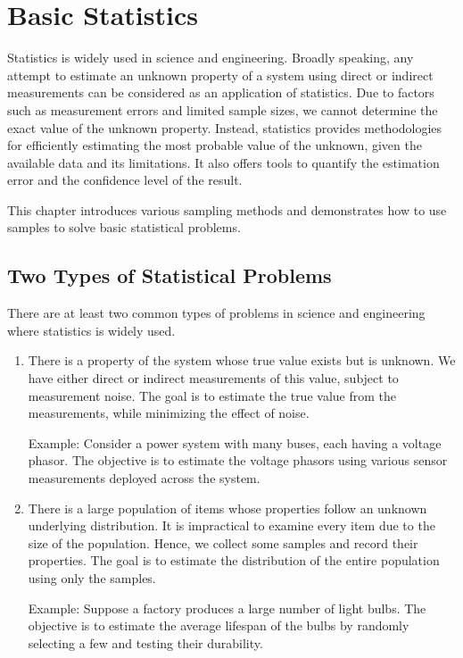 \chapter{Basic Statistics} \label{ch:statisticsandsampling}

Statistics is widely used in science and engineering. Broadly speaking, any attempt to estimate an unknown property of a system using direct or indirect measurements can be considered as an application of statistics. Due to factors such as measurement errors and limited sample sizes, we cannot determine the exact value of the unknown property. Instead, statistics provides methodologies for efficiently estimating the most probable value of the unknown, given the available data and its limitations. It also offers tools to quantify the estimation error and the confidence level of the result.

This chapter introduces various sampling methods and demonstrates how to use samples to solve basic statistical problems.

\section{Two Types of Statistical Problems}

There are at least two common types of problems in science and engineering where statistics is widely used.

\begin{enumerate}
	\item There is a property of the system whose true value exists but is unknown. We have either direct or indirect measurements of this value, subject to measurement noise. The goal is to estimate the true value from the measurements, while minimizing the effect of noise.

Example: Consider a power system with many buses, each having a voltage phasor. The objective is to estimate the voltage phasors using various sensor measurements deployed across the system.

	\item There is a large population of items whose properties follow an unknown underlying distribution. It is impractical to examine every item due to the size of the population. Hence, we collect some samples and record their properties. The goal is to estimate the distribution of the entire population using only the samples.

Example: Suppose a factory produces a large number of light bulbs. The objective is to estimate the average lifespan of the bulbs by randomly selecting a few and testing their durability.

\end{enumerate}

